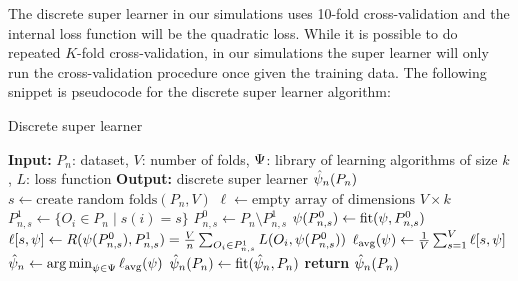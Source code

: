 \documentclass[./main.tex]{subfiles}
\begin{document}
The discrete super learner in our simulations uses 10-fold cross-validation and the internal loss function will be the quadratic loss. While it is possible to do repeated $ K $-fold cross-validation, in our simulations the super learner will only run the cross-validation procedure once given the training data. The following snippet is pseudocode for the discrete super learner algorithm:
\begin{algorithm}[H]
\caption{Discrete super learner}
\begin{algorithmic}[1]
\State \textbf{Input:} $P_n$: dataset, $V$: number of folds, $ \Psi $: library of learning algorithms of size $ k $, $ L $: loss function
\State \textbf{Output:} discrete super learner $ \hat{\psi}_n(P_n) $
\State $s \gets \text{create random folds}(P_n, V)$ 
\State $\ell \gets \text{empty array of dimensions } V \times k$  
    \State $P_{n, s}^{1} \gets \{O_i \in P_n \mid s(i) = s\} $
    \State $P_{n, s}^{0} \gets P_n \setminus P_{n,s}^{1} $
    \For{$\la \in \lib$}
    \State $ \psi(P_{n,s}^{0}) \gets \text{fit}(\psi, P_{n, s}^{0})$
    \State $\ell[s,\psi] \gets R(\psi(P_{n, s}^{0}), P_{n,s}^{1}) = \frac{V}{n} \sum_{O_i \in P_{n,s}^{1}} L(O_i, \psi(P_{n, s}^{0})) $
    \EndFor
\EndFor
\For{$\la \in \lib$}
    \State $ \ell_{\text{avg}}(\psi) \gets \frac{1}{V} \sum_{s = 1}^{V} \ell[s,\psi] $ 
\EndFor
\State $ \hat{\psi}_n \gets \operatorname*{arg\,min}_{\psi \in \Psi} \ell_{\text{avg}}(\psi) $
\State $ \hat{\psi}_n(P_n) \gets \text{fit}(\hat{\psi}_n, P_n) $  
\State \textbf{return} $ \hat{\psi}_n(P_n) $
\end{algorithmic}
\end{algorithm}
\end{document}
